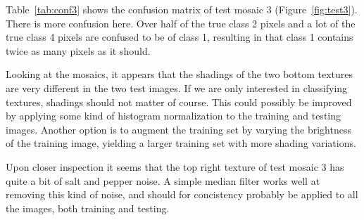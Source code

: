 \documentclass[a4paper]{article}
\begin{document}
Table~\ref{tab:conf3} shows the confusion matrix of test mosaic 3
(Figure~\ref{fig:test3}). There is more confusion here. Over half of the
true class 2 pixels and a lot of the true class 4 pixels are confused
to be of class 1, resulting in that class 1 contains twice as many
pixels as it should.

Looking at the mosaics, it appears that the shadings of the two bottom
textures are very different in the two test images. If we are only
interested in classifying textures, shadings should not matter of
course. This could possibly be improved by applying some kind of
histogram normalization to the training and testing images. Another
option is to augment the training set by varying the brightness of the
training image, yielding a larger training set with more shading
variations.

Upon closer inspection it seems that the top right texture of test
mosaic 3 has quite a bit of salt and pepper noise. A simple median
filter works well at removing this kind of noise, and should for
concistency probably be applied to all the images, both training and
testing.
\end{document}
